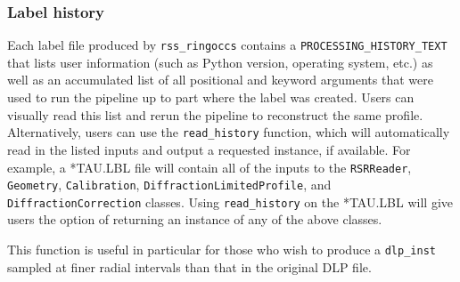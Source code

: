 \documentclass[titlepage, 12pt]{article}
\begin{document}
            \subsubsection{Label history}
            Each label file produced by \texttt{rss\_ringoccs} contains
            a \texttt{PROCESSING\_HISTORY\_TEXT} that lists user information
            (such as Python version, operating system, etc.) as well as an
            accumulated list of all positional and keyword arguments that were
            used to run the pipeline up to part where the label was created.
            Users can visually read this list and rerun the pipeline to
            reconstruct the same profile. Alternatively, users can use the
            \texttt{read\_history} function, which will automatically read
            in the listed inputs and output a requested instance, if available.
            For example, a *TAU.LBL file will contain all of the inputs to the
            \texttt{RSRReader}, \texttt{Geometry}, \texttt{Calibration},
            \texttt{DiffractionLimitedProfile}, and \texttt{DiffractionCorrection}
            classes. Using \texttt{read\_history} on the *TAU.LBL will give users
            the option of returning an instance of any of the above classes.
            \par\hfill\par
            This function is useful in particular for those who wish to
            produce a \texttt{dlp\_inst} sampled at finer radial intervals than that in the original DLP file.
            
\end{document}
